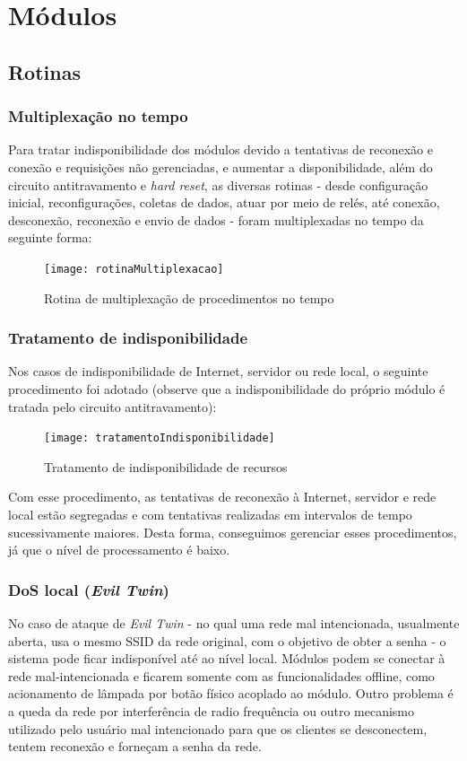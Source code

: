 \section{Módulos}
\subsection {Rotinas}
\subsubsection{Multiplexação no tempo}
Para tratar indisponibilidade dos módulos devido a tentativas de reconexão e conexão e requisições não gerenciadas, e aumentar a disponibilidade, além do circuito antitravamento e \textit{hard reset}, as diversas rotinas - desde configuração inicial, reconfigurações, coletas de dados, atuar por meio de relés, até conexão, desconexão, reconexão e envio de dados - foram multiplexadas no tempo da seguinte forma:

\begin{figure} [H]
	\centering
	\caption{Rotina de multiplexação de procedimentos no tempo}
  \texttt{[image: rotinaMultiplexacao]}
\label{fig:rotinaMultiplexacao}
\end{figure}

\subsubsection{Tratamento de indisponibilidade}
Nos casos de indisponibilidade de Internet, servidor ou rede local, o seguinte procedimento foi adotado (observe que a indisponibilidade do próprio módulo é tratada pelo circuito antitravamento):

\begin{figure}[H]
	\centering
	\caption{Tratamento de indisponibilidade de recursos}
  \texttt{[image: tratamentoIndisponibilidade]}
\label{fig:tratamentoIndisponibilidade}
\end{figure}

Com esse procedimento, as tentativas de reconexão à Internet, servidor e rede local estão segregadas e com tentativas realizadas em intervalos de tempo sucessivamente maiores. Desta forma, conseguimos gerenciar esses procedimentos, já que o nível de processamento é baixo.

\subsubsection{DoS local (\textit{Evil Twin})}
No caso de ataque de \textit{Evil Twin} - no qual uma rede mal intencionada, usualmente aberta, usa o mesmo SSID da rede original, com o objetivo de obter a senha - o sistema pode ficar indisponível até ao nível local. Módulos podem se conectar à rede mal-intencionada e ficarem somente com as funcionalidades offline, como acionamento de lâmpada por botão físico acoplado ao módulo. Outro problema é a queda da rede por interferência de radio frequência ou outro mecanismo utilizado pelo usuário mal intencionado para que os clientes se desconectem, tentem reconexão e forneçam a senha da rede.


